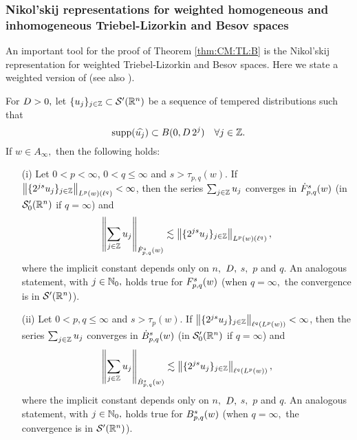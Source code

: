 {  

\subsubsection{Nikol'skij representations for weighted homogeneous and inhomogeneous Triebel-Lizorkin and Besov spaces}

An important tool for the proof of Theorem \ref{thm:CM:TL:B} is the Nikol'skij representation for weighted Triebel-Lizorkin and Besov spaces. Here we state a weighted version of \cite[Theorem 3.7]{MR837335} (see also \cite[Section 2.5.2]{MR3024598}). 

\begin{theorem}\label{thm:Nikolskij:weighted} For $\A> 0,$ let $\{u_j\}_{j \in \ent} \subset \mathcal{S}'(\rn)$ be a sequence of tempered distributions such that
\begin{equation*}
\supp(\widehat{u_j}) \subset B(0, \A\, 2^j ) \quad \forall j \in \ent.
\end{equation*}
If $w\in A_\infty,$ then the following holds:  
\begin{enumerate}
\item[(i)]\label{item:thh:Nikolskij:TL} Let $0 < p < \infty$, $0 < q \leq \infty$ and $s > \tau_{p,q}(w)$. If $\norm{\{2^{js} u_j\}_{j\in\ent}}{L^p(w)(\ell^{q})} < \infty$, then the series $\sum_{j \in \ent} u_j$ converges in $\tlw{p}{s}{q}{w}$ (in $\mathcal{S}'_0(\rn)$ if $q=\infty$) and 
\begin{equation*}
\norm{\sum_{j \in \ent} u_j}{\tlw{p}{s}{q}{w}} \lesssim  \norm{\{2^{js} u_j\}_{j\in\ent}}{L^p(w)(\ell^{q})},
\end{equation*}
where the implicit constant depends only on $n,$ $\A,$ $s,$ $p$ and  $q.$  An analogous statement, with $j\in\naz,$ holds true for $\itlw{p}{s}{q}{w}$ (when $q=\infty,$  the convergence is in $\swp$).
\item[(ii)]\label{item:thh:Nikolskij:B} Let $0 < p, q \leq \infty$ and $s > \tau_p(w)$. If $\norm{\{2^{js} u_j\}_{j\in\ent}}{\ell^{q}(L^p(w))} < \infty$, then the series $\sum_{j \in \ent} u_j$ converges in  $\besw{p}{s}{q}{w}$ (in $\mathcal{S}'_0(\rn)$ if $q=\infty$) and 
\begin{equation*}
\norm{\sum_{j \in \ent} u_j}{\besw{p}{s}{q}{w}} \lesssim  \norm{\{2^{js} u_j\}_{j\in\ent}}{\ell^{q}(L^p(w))},
\end{equation*}
where the implicit constant depends only on $n,$ $\A,$ $s,$ $p$ and $q.$   An analogous statement, with $j\in\naz,$ holds true for $\ibesw{p}{s}{q}{w}$ (when $q=\infty,$  the convergence is in $\swp$).
\end{enumerate}
\end{theorem} 
 
}
